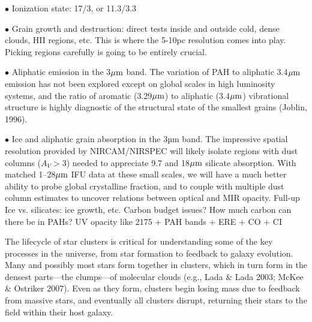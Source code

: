 \documentclass[12pt]{article}
\begin{document}
\noindent $\bullet$ Ionization state: 17/3, or 11.3/3.3

\noindent $\bullet$ Grain growth and destruction: direct tests inside and outside cold, dense clouds, HII regions, etc.  This is where the 5-10pc resolution comes into play.  Picking regions carefully is going to be entirely crucial.


\noindent $\bullet$ Aliphatic emission in the 3$\hbox{$\mu$m}$ band.  The variation of PAH to aliphatic 3.4$\hbox{$\mu$m}$ emission has not been explored except on global scales in high luminosity systems, and the ratio of aromatic (3.29$\hbox{$\mu$m}$) to aliphatic (3.4$\hbox{$\mu$m}$) vibrational structure is highly diagnostic of the structural state of the smallest grains (Joblin, 1996).

\noindent $\bullet$ Ice and aliphatic grain absorption in the 3µm band.  The impressive spatial resolution provided by NIRCAM/NIRSPEC will likely isolate regions with dust columns ($A_V>3$) needed to appreciate 9.7 and 18$\hbox{$\mu$m}$ silicate absorption.  With matched 1–28$\hbox{$\mu$m}$ IFU data at these small scales, we will have a much better ability to probe global crystalline fraction, and to couple with multiple dust column estimates to uncover relations between optical and MIR opacity.  Full-up Ice vs. silicates: ice growth, etc. 
Carbon budget issues?  How much carbon can there be in PAHs?  UV opacity like 2175 + PAH bands + ERE + CO + CI

\vspace{0.1in}


\vspace{0.1in}
The lifecycle of star clusters is critical for understanding some of the key processes in the universe, from star formation to feedback to galaxy evolution.  Many and possibly most stars form together in clusters, which in turn form in the densest parts---the clumps---of molecular clouds (e.g., Lada \& Lada 2003; McKee \& Ostriker 2007).  Even as they form, clusters begin losing mass due to feedback from massive stars, and eventually all clusters disrupt, returning their stars to the field within their host galaxy.
\end{document}
